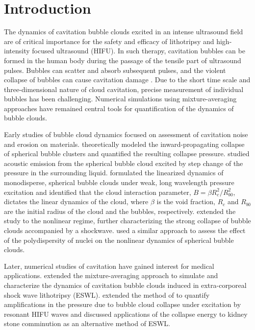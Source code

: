 \documentclass{jfm}
\begin{document}
\section{Introduction}
\label{section:intro}
The dynamics of cavitation bubble clouds excited in an intense ultrasound field are of critical importance for the safety and efficacy of lithotripsy and high-intensity focused ultrasound (HIFU).
In such therapy, cavitation bubbles can be formed in the human body during the passage of the tensile part of ultrasound pulses. Bubbles can scatter and absorb subsequent pulses, and the violent collapse of bubbles can cause cavitation damage \citep{Coleman87,Pishchalnikov03,Matsumoto05b,McAteer05,Ikeda06,Bailey06,Stride10,Miller12}.
Due to the short time scale and three-dimensional nature of cloud cavitation, precise measurement of individual bubbles has been challenging.
Numerical simulations using mixture-averaging approaches \citep{Van68,Biesheuvel84} have remained central tools for quantification of the dynamics of bubble clouds.

Early studies of bubble cloud dynamics focused on assessment of cavitation noise and erosion on materials.
\citet{Morch80,Morch82} theoretically modeled the inward-propagating collapse of spherical bubble clusters and quantified the resulting collapse pressure.
\citet{Omta87} studied acoustic emission from the spherical bubble cloud excited by step change of the pressure in the surrounding liquid.
\citet{dAgostino89} formulated the linearized dynamics of monodisperse, spherical bubble clouds under weak, long wavelength pressure excitation and identified that the cloud interaction parameter, $B=\beta R_c^2/R_{b0}^2$, dictates the linear dynamics of the cloud, where $\beta$ is the void fraction, $R_c$ and $R_{b0}$ are the initial radius of the cloud and the bubbles, respectively. \citet{Wang94,Wang99} extended the study to the nonlinear regime, further characterizing the strong collapse of bubble clouds accompanied by a shockwave.
\citet{Shimada00} used a similar approach to assess the effect of the polydispersity of nuclei on the nonlinear dynamics of spherical bubble clouds.

Later, numerical studies of cavitation have gained interest for medical applications. \citet{Tanguay03} extended the mixture-averaging approach to simulate and characterize the dynamics of cavitation bubble clouds induced in extra-corporeal shock wave lithotripsy (ESWL).
\citet{Matsumoto05} extended the method of \citet{Shimada00} to quantify amplifications in the pressure due to bubble cloud collapse under excitation by resonant HIFU waves and discussed applications of the collapse energy to kidney stone comminution as an alternative method of ESWL.
\end{document}
